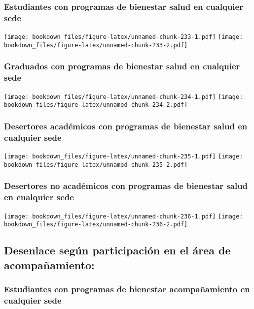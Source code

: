 \documentclass[]{article}
\theoremstyle{definition}
\theoremstyle{definition}
\theoremstyle{definition}
\theoremstyle{remark}
\begin{document}
\subsubsection{Estudiantes con programas de bienestar salud en cualquier
sede}\label{estudiantes-con-programas-de-bienestar-salud-en-cualquier-sede-1}

\texttt{[image: bookdown\_files/figure-latex/unnamed-chunk-233-1.pdf]}
\texttt{[image: bookdown\_files/figure-latex/unnamed-chunk-233-2.pdf]}

\subsubsection{Graduados con programas de bienestar salud en cualquier
sede}\label{graduados-con-programas-de-bienestar-salud-en-cualquier-sede-1}

\texttt{[image: bookdown\_files/figure-latex/unnamed-chunk-234-1.pdf]}
\texttt{[image: bookdown\_files/figure-latex/unnamed-chunk-234-2.pdf]}

\subsubsection{Desertores académicos con programas de bienestar salud en
cualquier
sede}\label{desertores-academicos-con-programas-de-bienestar-salud-en-cualquier-sede-1}

\texttt{[image: bookdown\_files/figure-latex/unnamed-chunk-235-1.pdf]}
\texttt{[image: bookdown\_files/figure-latex/unnamed-chunk-235-2.pdf]}

\subsubsection{Desertores no académicos con programas de bienestar salud
en cualquier
sede}\label{desertores-no-academicos-con-programas-de-bienestar-salud-en-cualquier-sede-1}

\texttt{[image: bookdown\_files/figure-latex/unnamed-chunk-236-1.pdf]}
\texttt{[image: bookdown\_files/figure-latex/unnamed-chunk-236-2.pdf]}

\subsection{Desenlace según participación en el área de
acompañamiento:}\label{desenlace-segun-participacion-en-el-area-de-acompanamiento-1}

\subsubsection{Estudiantes con programas de bienestar acompañamiento en
cualquier
sede}\label{estudiantes-con-programas-de-bienestar-acompanamiento-en-cualquier-sede-1}
\end{document}
